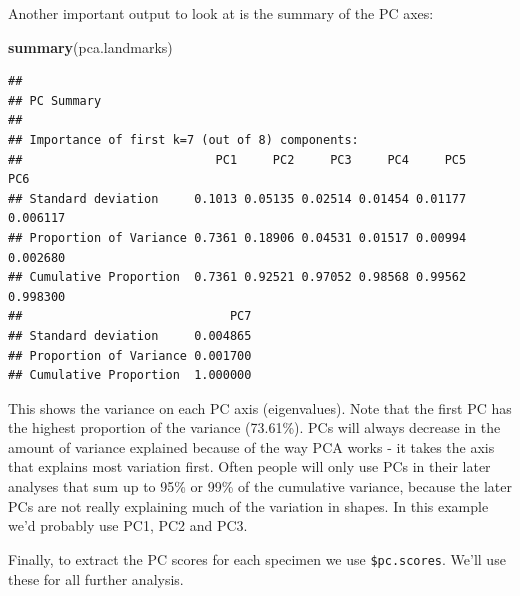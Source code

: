 \documentclass[]{book}
\newenvironment{Shaded}{\begin{snugshade}}{\end{snugshade}}
\newcommand{\KeywordTok}[1]{\textcolor[rgb]{0.13,0.29,0.53}{\textbf{{#1}}}}
\newcommand{\NormalTok}[1]{{#1}}
\theoremstyle{definition}
\theoremstyle{definition}
\theoremstyle{definition}
\theoremstyle{remark}
\begin{document}
Another important output to look at is the summary of the PC axes:

\begin{Shaded}
\begin{Highlighting}[]
\KeywordTok{summary}\NormalTok{(pca.landmarks)}
\end{Highlighting}
\end{Shaded}

\begin{verbatim}
## 
## PC Summary
## 
## Importance of first k=7 (out of 8) components:
##                           PC1     PC2     PC3     PC4     PC5      PC6
## Standard deviation     0.1013 0.05135 0.02514 0.01454 0.01177 0.006117
## Proportion of Variance 0.7361 0.18906 0.04531 0.01517 0.00994 0.002680
## Cumulative Proportion  0.7361 0.92521 0.97052 0.98568 0.99562 0.998300
##                             PC7
## Standard deviation     0.004865
## Proportion of Variance 0.001700
## Cumulative Proportion  1.000000
\end{verbatim}

This shows the variance on each PC axis (eigenvalues). Note that the
first PC has the highest proportion of the variance (73.61\%). PCs will
always decrease in the amount of variance explained because of the way
PCA works - it takes the axis that explains most variation first. Often
people will only use PCs in their later analyses that sum up to 95\% or
99\% of the cumulative variance, because the later PCs are not really
explaining much of the variation in shapes. In this example we'd
probably use PC1, PC2 and PC3.

Finally, to extract the PC scores for each specimen we use
\texttt{\$pc.scores}. We'll use these for all further analysis.

\begin{Shaded}
\end{Shaded}
\end{document}

